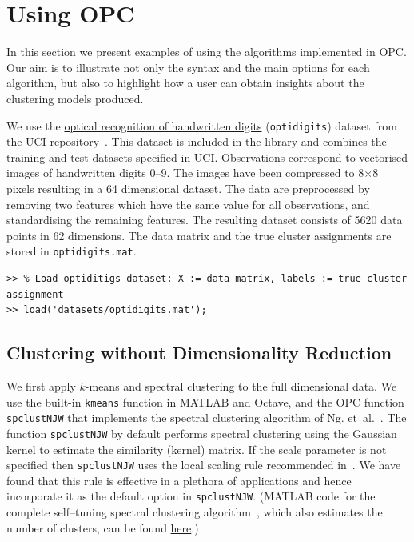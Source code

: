 \documentclass{book}
\begin{document}
\chapter{Using OPC}\label{sec:using}

In this section we present examples of using the algorithms
implemented in OPC. Our aim is to illustrate not only the syntax and the main options
for each algorithm, but also to highlight how a user can obtain insights about
the clustering models produced.

We use the \href{https://archive.ics.uci.edu/ml/datasets/optical+recognition+of+handwritten+digits}
{optical recognition of handwritten digits} ({\tt optidigits}) dataset
from the UCI repository~\cite{UCI}. This dataset is included in the library and
combines the training and test datasets specified in UCI. 
%
Observations correspond to
vectorised images of handwritten digits 0--9. The images have been compressed
to 8$\times$8 pixels resulting in a 64 dimensional dataset.
%
The data are preprocessed by removing two features which have the same value for all
observations, and standardising the remaining features. The resulting dataset consists of
5620 data points in 62 dimensions. The data matrix and the true cluster
assignments are stored in {\tt optidigits.mat}.


\begin{lstlisting}
>> % Load optiditigs dataset: X := data matrix, labels := true cluster assignment
>> load('datasets/optidigits.mat');
\end{lstlisting}


\section{Clustering without Dimensionality Reduction}

We first apply $k$-means and spectral clustering to the full dimensional data.
We use the built-in {\tt kmeans} function in MATLAB and Octave, and the OPC
function {\tt spclustNJW} that implements the spectral clustering algorithm of
Ng.  et~al.~\cite{NgJW2001}. 
%
The function {\tt spclustNJW} by default performs spectral clustering using
the Gaussian kernel to estimate the similarity (kernel) matrix.
%
If the scale parameter is not specified then {\tt spclustNJW} uses the local scaling
rule recommended in~\cite{Zelnik2004}. We have found that this
rule is effective in a plethora of applications and hence incorporate it
as the default option in {\tt spclustNJW}. (MATLAB code for the complete
self--tuning spectral clustering algorithm~\cite{Zelnik2004},
which also
estimates the number of clusters, can be found
\href{http://lihi.eew.technion.ac.il/files/Demos/SelfTuningClustering.html}{here}.)
\end{document}
